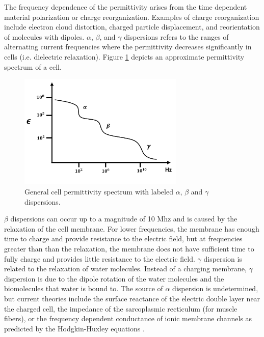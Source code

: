  \par The frequency dependence of the permittivity arises from the time dependent material polarization or charge reorganization. Examples of charge reorganization include electron cloud distortion, charged particle displacement, and reorientation of molecules with dipoles. $\alpha$, $\beta$, and $\gamma$ dispersions refers to the ranges of alternating current frequencies where the permittivity decreases significantly in cells (i.e. dielectric relaxation). Figure \ref{fig:schwan_dispersions} depicts an approximate permittivity spectrum of a cell.
 
 \begin{figure}[ht]
 \centering
 \includegraphics[width=0.7\textwidth]{images/schwanDispersions.png}
 \caption[General cell permittivity spectrum]{General cell permittivity spectrum with labeled $\alpha$, $\beta$ and $\gamma$ dispersions.}
 \label{fig:schwan_dispersions}
 \end{figure}
 
 \par $\beta$ dispersions can occur up to a magnitude of 10 Mhz and is caused by the relaxation of the cell membrane. For lower frequencies, the membrane has enough time to charge and provide resistance to the electric field, but at frequencies greater than than the relaxation, the membrane does not have sufficient time to fully charge and provides little resistance to the electric field. $\gamma$ dispersion is related to the relaxation of water molecules. Instead of a charging membrane, $\gamma$ dispersion is due to the dipole rotation of the water molecules and the biomolecules that water is bound to. The source of $\alpha$ dispersion is undetermined, but current theories include the surface reactance of the electric double layer near the charged cell, the impedance of the sarcoplasmic recticulum (for muscle fibers), or the frequency dependent conductance of ionic membrane channels as predicted by the Hodgkin-Huxley equations \cite{schwan_electrical_1994}.
 
